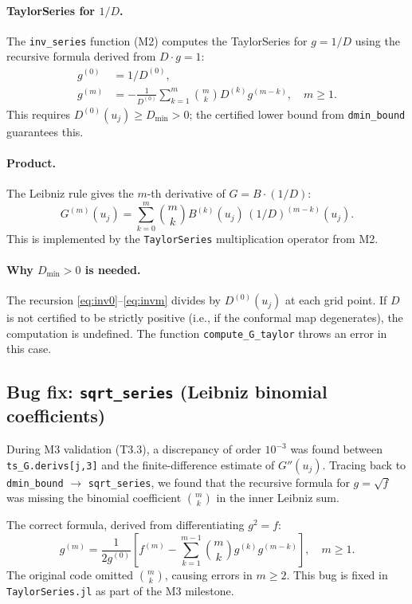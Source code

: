 \documentclass[11pt]{article}
\theoremstyle{definition}
\begin{document}
\paragraph{TaylorSeries for $1/D$.}
The \texttt{inv\_series} function (M2) computes the TaylorSeries for $g = 1/D$
using the recursive formula derived from $D \cdot g = 1$:
\begin{align}
  g^{(0)} &= 1/D^{(0)}, \label{eq:inv0}\\
  g^{(m)} &= -\frac{1}{D^{(0)}} \sum_{k=1}^{m} \binom{m}{k} D^{(k)} g^{(m-k)},
             \quad m \ge 1. \label{eq:invm}
\end{align}
This requires $D^{(0)}(u_j) \ge D_{\min} > 0$; the certified lower bound
from \texttt{dmin\_bound} guarantees this.

\paragraph{Product.}
The Leibniz rule gives the $m$-th derivative of $G = B \cdot (1/D)$:
\[
  G^{(m)}(u_j) = \sum_{k=0}^{m} \binom{m}{k} B^{(k)}(u_j)\, (1/D)^{(m-k)}(u_j).
\]
This is implemented by the \texttt{TaylorSeries} multiplication operator from M2.

\paragraph{Why $D_{\min} > 0$ is needed.}
The recursion \eqref{eq:inv0}--\eqref{eq:invm} divides by $D^{(0)}(u_j)$ at
each grid point.  If $D$ is not certified to be strictly positive (i.e.,
if the conformal map degenerates), the computation is undefined.
The function \texttt{compute\_G\_taylor} throws an error in this case.

\subsection{Bug fix: \texttt{sqrt\_series} (Leibniz binomial coefficients)}

During M3 validation (T3.3), a discrepancy of order $10^{-3}$ was found
between \texttt{ts\_G.derivs[j,3]} and the finite-difference estimate of
$G''(u_j)$.  Tracing back to \texttt{dmin\_bound} $\to$ \texttt{sqrt\_series},
we found that the recursive formula for $g = \sqrt{f}$ was missing the
binomial coefficient $\binom{m}{k}$ in the inner Leibniz sum.

The correct formula, derived from differentiating $g^2 = f$:
\[
  g^{(m)} = \frac{1}{2g^{(0)}}\!\left[f^{(m)} -
    \sum_{k=1}^{m-1} \binom{m}{k} g^{(k)} g^{(m-k)}\right], \quad m \ge 1.
\]
The original code omitted $\binom{m}{k}$, causing errors in $m \ge 2$.
This bug is fixed in \texttt{TaylorSeries.jl} as part of the M3 milestone.
\end{document}
